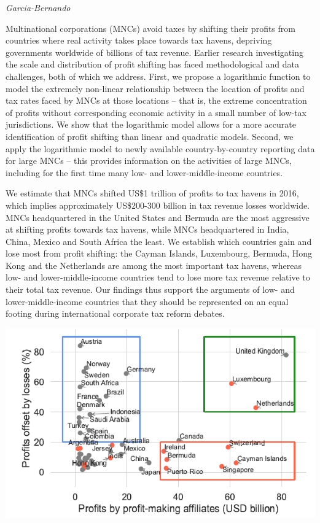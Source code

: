 \documentclass[
]{book}
\begin{document}
\emph{Garcia-Bernando}

Multinational corporations (MNCs) avoid taxes by shifting their profits from countries where real activity takes place towards tax havens, depriving governments worldwide of billions of tax revenue. Earlier research investigating the scale and distribution of profit shifting has faced methodological and data challenges, both of which we address. First, we propose a logarithmic function to model the extremely non-linear relationship between the location of profits and tax rates faced by MNCs at those locations -- that is, the extreme concentration of profits without corresponding economic activity in a small number of low-tax jurisdictions. We show that the logarithmic model allows for a more accurate identification of profit shifting than linear and quadratic models. Second, we apply the logarithmic model to newly available country-by-country reporting data for large MNCs -- this provides information on the activities of large MNCs, including for the first time many low- and lower-middle-income countries.

We estimate that MNCs shifted US\$1 trillion of profits to tax havens in 2016, which implies approximately US\$200-300 billion in tax revenue losses worldwide. MNCs headquartered in the United States and Bermuda are the most aggressive at shifting profits towards tax havens, while MNCs headquartered in India, China, Mexico and South Africa the least. We establish which countries gain and lose most from profit shifting: the Cayman Islands, Luxembourg, Bermuda, Hong Kong and the Netherlands are among the most important tax havens, whereas low- and lower-middle-income countries tend to lose more tax revenue relative to their total tax revenue. Our findings thus support the arguments of low- and lower-middle-income countries that they should be represented on an equal footing during international corporate tax reform debates.

\includegraphics{fig/profit_shifting.png}
\end{document}
